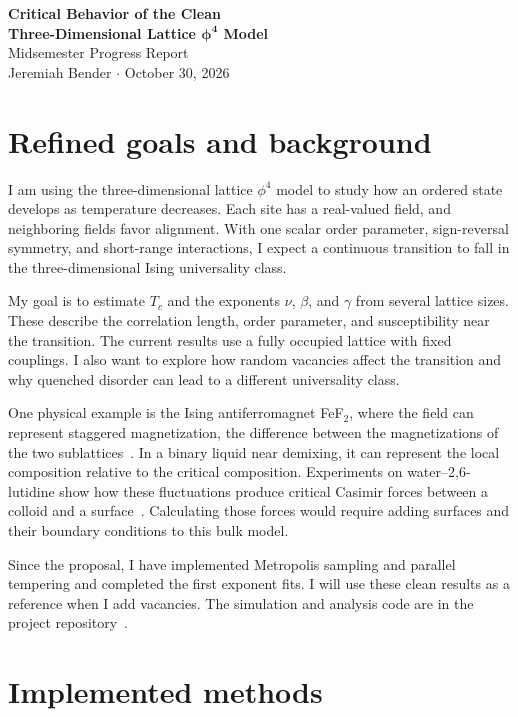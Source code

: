 \documentclass[11pt,letterpaper]{article}
\begin{document}
\begin{center}
{\Large\bfseries Critical Behavior of the Clean\\[2pt]
Three-Dimensional Lattice \(\boldsymbol{\phi^4}\) Model}\\[6pt]
{\large Midsemester Progress Report}\\[4pt]
Jeremiah Bender \quad $\cdot$ \quad October 30, 2026
\end{center}
\vspace{-8pt}

\section{Refined goals and background}
I am using the three-dimensional lattice $\phi^4$ model to study how an
ordered state develops as temperature decreases. Each site has a real-valued
field, and neighboring fields favor alignment. With one scalar order
parameter, sign-reversal symmetry, and short-range interactions, I expect
a continuous transition to fall in the three-dimensional Ising universality class.

My goal is to estimate $T_c$ and the exponents $\nu$, $\beta$, and $\gamma$
from several lattice sizes. These describe the correlation length, order
parameter, and susceptibility near the transition. The current results use
a fully occupied lattice with fixed couplings. I also want to explore how
random vacancies affect the transition and why quenched disorder can lead
to a different universality class.

One physical example is the Ising antiferromagnet FeF$_2$, where the field
can represent staggered magnetization, the difference
between the magnetizations of the two sublattices~\cite{belanger}.
In a binary liquid near demixing, it can represent the local composition
relative to the critical composition. Experiments on water--2,6-lutidine
show how these fluctuations produce critical Casimir forces between a
colloid and a surface~\cite{gambassi}. Calculating those forces would
require adding surfaces and their boundary conditions to this bulk model.

Since the proposal, I have implemented Metropolis sampling and parallel
tempering and completed the first exponent fits. I will use these clean
results as a reference when I add vacancies. The simulation and analysis
code are in the project repository~\cite{repository}.

\section{Implemented methods}
\end{document}
